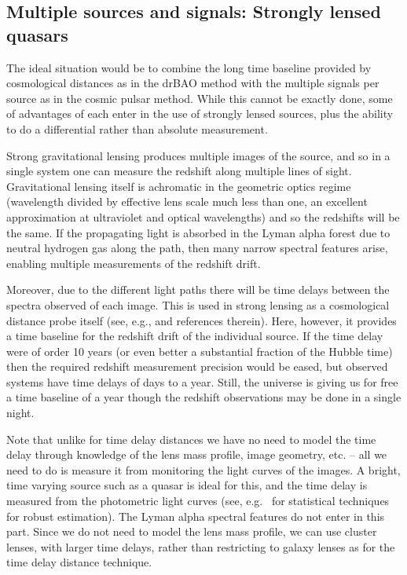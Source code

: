 \documentclass[preprint]{aastex}
\begin{document}
\subsection{Multiple sources and signals: Strongly lensed quasars} \label{sec:lens} 

The ideal situation would be to combine the long time baseline provided 
by cosmological distances as in the drBAO method with the multiple 
signals per source as in the cosmic pulsar method.  While this cannot be 
exactly done, some of advantages of each enter in the use of strongly 
lensed sources, plus the ability to do a differential rather than absolute 
measurement. 

Strong gravitational lensing produces multiple images of the source, 
and so in a single system one can measure the redshift along multiple 
lines of sight.  Gravitational lensing itself is achromatic in the 
geometric optics regime (wavelength divided by effective lens scale 
much less than one, an excellent approximation at ultraviolet and optical 
wavelengths) 
and so the redshifts will be the same.  If the propagating light is 
absorbed in the Lyman alpha forest due to neutral hydrogen gas along 
the path, then many narrow spectral features arise, enabling multiple 
measurements of the redshift drift. 

Moreover, due to the different light paths there will be time delays 
between the spectra observed of each image.  This is used in strong 
lensing as a cosmological distance probe itself (see, e.g., \cite{13061272} 
and references therein).  Here, however, it provides a time baseline for 
the redshift drift of the individual source.  If the time delay were of 
order 10 years (or even better a substantial fraction of the Hubble time) 
then the required redshift measurement precision would be eased, but 
observed systems have time delays of days to a year.  Still, the universe 
is giving us for free a time baseline of a year though the redshift 
observations may be done in a single night.  

Note that unlike for time delay distances 
we have no need to model the time delay through knowledge of the lens mass 
profile, image geometry, etc. -- all we need to do is measure it from 
monitoring the light curves of the images.  A bright, time varying source 
such as a quasar is ideal for this, and the time delay is measured from 
the photometric light curves (see, e.g.\ \cite{tewes,hkl} for statistical 
techniques for 
robust estimation).  The Lyman alpha spectral features do not enter in 
this part.  Since we do not need to model the lens mass profile, we can 
use cluster lenses, with larger time delays, rather than restricting to 
galaxy lenses as for the time delay distance technique. 
\end{document}
